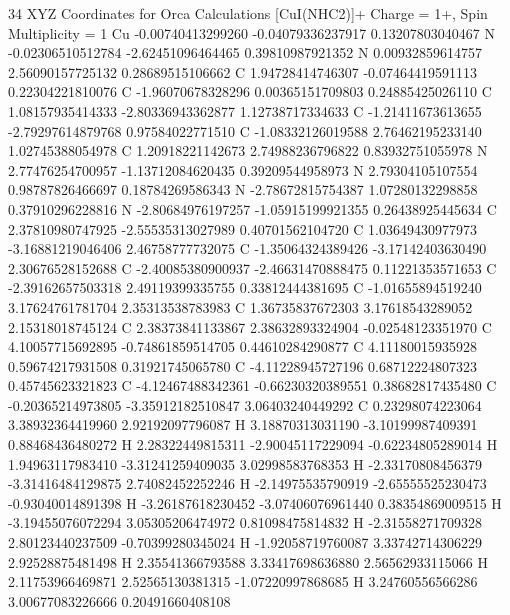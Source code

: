 34 
XYZ Coordinates for Orca Calculations 
[CuI(NHC2)]+ 
Charge = 1+, Spin Multiplicity = 1 
  Cu  -0.00740413299260     -0.04079336237917      0.13207803040467 
  N   -0.02306510512784     -2.62451096464465      0.39810987921352 
  N   0.00932859614757      2.56090157725132      0.28689515106662 
  C   1.94728414746307     -0.07464419591113      0.22304221810076 
  C   -1.96070678328296      0.00365151709803      0.24885425026110 
  C   1.08157935414333     -2.80336943362877      1.12738717334633 
  C   -1.21411673613655     -2.79297614879768      0.97584022771510 
  C   -1.08332126019588      2.76462195233140      1.02745388054978 
  C   1.20918221142673      2.74988236796822      0.83932751055978 
  N   2.77476254700957     -1.13712084620435      0.39209544958973 
  N   2.79304105107554      0.98787826466697      0.18784269586343 
  N   -2.78672815754387      1.07280132298858      0.37910296228816 
  N   -2.80684976197257     -1.05915199921355      0.26438925445634 
  C   2.37810980747925     -2.55535313027989      0.40701562104720 
  C   1.03649430977973     -3.16881219046406      2.46758777732075 
  C   -1.35064324389426     -3.17142403630490      2.30676528152688 
  C   -2.40085380900937     -2.46631470888475      0.11221353571653 
  C   -2.39162657503318      2.49119399335755      0.33812444381695 
  C   -1.01655894519240      3.17624761781704      2.35313538783983 
  C   1.36735837672303      3.17618543289052      2.15318018745124 
  C   2.38373841133867      2.38632893324904     -0.02548123351970 
  C   4.10057715692895     -0.74861859514705      0.44610284290877 
  C   4.11180015935928      0.59674217931508      0.31921745065780 
  C   -4.11228945727196      0.68712224807323      0.45745623321823 
  C   -4.12467488342361     -0.66230320389551      0.38682817435480 
  C   -0.20365214973805     -3.35912182510847      3.06403240449292 
  C   0.23298074223064      3.38932364419960      2.92192097796087 
  H   3.18870313031190     -3.10199987409391      0.88468436480272 
  H   2.28322449815311     -2.90045117229094     -0.62234805289014 
  H   1.94963117983410     -3.31241259409035      3.02998583768353 
  H   -2.33170808456379     -3.31416484129875      2.74082452252246 
  H   -2.14975535790919     -2.65555525230473     -0.93040014891398 
  H   -3.26187618230452     -3.07406076961440      0.38354869009515 
  H   -3.19455076072294      3.05305206474972      0.81098475814832 
  H   -2.31558271709328      2.80123440237509     -0.70399280345024 
  H   -1.92058719760087      3.33742714306229      2.92528875481498 
  H   2.35541366793588      3.33417698636880      2.56562933115066 
  H   2.11753966469871      2.52565130381315     -1.07220997868685 
  H   3.24760556566286      3.00677083226666      0.20491660408108 


